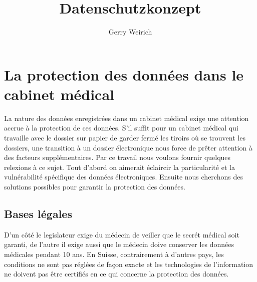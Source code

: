 \documentclass[a4paper]{scrartcl}
\begin{document}
\title{Datenschutzkonzept}
\author{Gerry Weirich}
\maketitle
\section{La protection des données dans le cabinet médical}
La nature des données enregistrées dans un cabinet médical exige une attention accrue à la protection de ces données. S'il suffit pour un cabinet médical qui travaille avec le dossier sur papier de garder fermé les tiroirs où se trouvent les dossiers, une transition à un dossier électronique nous force de prêter attention à des facteurs supplémentaires.  Par ce travail nous voulons fournir quelques relexions à ce sujet. Tout d'abord on aimerait éclaircir la particularité et la vulnérabilité spécifique des données électroniques. Ensuite nous cherchons des solutions possibles pour garantir la protection des données.

\subsection{Bases légales}
D'un côté le legislateur exige du médecin de veiller que le secrét médical soit garanti, de l'autre il exige aussi que le médecin doive conserver les données médicales pendant 10 ans. En Suisse, contrairement à d'autres pays, les conditions ne sont pas réglées de façon exacte et les technologies de l'information ne doivent pas être certifiés en ce qui concerne la protection des données.
\end{document}

